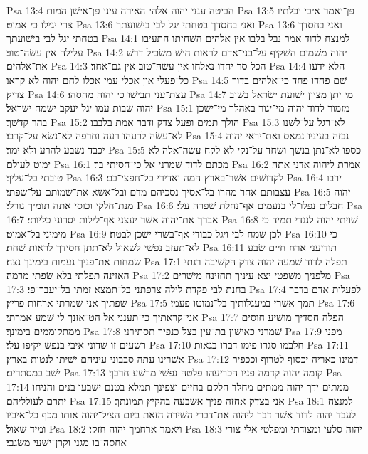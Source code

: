 Psa 13:4  הביטה ענני יהוה אלהי האירה עיני פן־אישׁן המות׃
Psa 13:5  פן־יאמר איבי יכלתיו צרי יגילו כי אמוט׃
Psa 13:6  ואני בחסדך בטחתי יגל לבי בישׁועתך
Psa 13:6  ואני בחסדך בטחתי יגל לבי בישׁועתך
Psa 14:1  למנצח לדוד אמר נבל בלבו אין אלהים השׁחיתו התעיבו עלילה אין עשׂה־טוב׃
Psa 14:2  יהוה משׁמים השׁקיף על־בני־אדם לראות הישׁ משׂכיל דרשׁ את־אלהים׃
Psa 14:3  הכל סר יחדו נאלחו אין עשׂה־טוב אין גם־אחד׃
Psa 14:4  הלא ידעו כל־פעלי און אכלי עמי אכלו לחם יהוה לא קראו׃
Psa 14:5  שׁם פחדו פחד כי־אלהים בדור צדיק׃
Psa 14:6  עצת־עני תבישׁו כי יהוה מחסהו׃
Psa 14:7  מי יתן מציון ישׁועת ישׂראל בשׁוב יהוה שׁבות עמו יגל יעקב ישׂמח ישׂראל׃
Psa 15:1  מזמור לדוד יהוה מי־יגור באהלך מי־ישׁכן בהר קדשׁך׃
Psa 15:2  הולך תמים ופעל צדק ודבר אמת בלבבו׃
Psa 15:3  לא־רגל על־לשׁנו לא־עשׂה לרעהו רעה וחרפה לא־נשׂא על־קרבו׃
Psa 15:4  נבזה בעיניו נמאס ואת־יראי יהוה יכבד נשׁבע להרע ולא ימר׃
Psa 15:5  כספו לא־נתן בנשׁך ושׁחד על־נקי לא לקח עשׂה־אלה לא ימוט לעולם׃
Psa 16:1  מכתם לדוד שׁמרני אל כי־חסיתי בך׃
Psa 16:2  אמרת ליהוה אדני אתה טובתי בל־עליך׃
Psa 16:3  לקדושׁים אשׁר־בארץ המה ואדירי כל־חפצי־בם׃
Psa 16:4  ירבו עצבותם אחר מהרו בל־אסיך נסכיהם מדם ובל־אשׂא את־שׁמותם על־שׂפתי׃
Psa 16:5  יהוה מנת־חלקי וכוסי אתה תומיך גורלי׃
Psa 16:6  חבלים נפלו־לי בנעמים אף־נחלת שׁפרה עלי׃
Psa 16:7  אברך את־יהוה אשׁר יעצני אף־לילות יסרוני כליותי׃
Psa 16:8  שׁויתי יהוה לנגדי תמיד כי מימיני בל־אמוט׃
Psa 16:9  לכן שׂמח לבי ויגל כבודי אף־בשׂרי ישׁכן לבטח׃
Psa 16:10  כי לא־תעזב נפשׁי לשׁאול לא־תתן חסידך לראות שׁחת׃
Psa 16:11  תודיעני ארח חיים שׂבע שׂמחות את־פניך נעמות בימינך נצח׃
Psa 17:1  תפלה לדוד שׁמעה יהוה צדק הקשׁיבה רנתי האזינה תפלתי בלא שׂפתי מרמה׃
Psa 17:2  מלפניך משׁפטי יצא עיניך תחזינה מישׁרים׃
Psa 17:3  בחנת לבי פקדת לילה צרפתני בל־תמצא זמתי בל־יעבר־פי׃
Psa 17:4  לפעלות אדם בדבר שׂפתיך אני שׁמרתי ארחות פריץ׃
Psa 17:5  תמך אשׁרי במעגלותיך בל־נמוטו פעמי׃
Psa 17:6  אני־קראתיך כי־תענני אל הט־אזנך לי שׁמע אמרתי׃
Psa 17:7  הפלה חסדיך מושׁיע חוסים ממתקוממים בימינך׃
Psa 17:8  שׁמרני כאישׁון בת־עין בצל כנפיך תסתירני׃
Psa 17:9  מפני רשׁעים זו שׁדוני איבי בנפשׁ יקיפו עלי׃
Psa 17:10  חלבמו סגרו פימו דברו בגאות׃
Psa 17:11  אשׁרינו עתה סבבוני עיניהם ישׁיתו לנטות בארץ׃
Psa 17:12  דמינו כאריה יכסוף לטרוף וככפיר ישׁב במסתרים׃
Psa 17:13  קומה יהוה קדמה פניו הכריעהו פלטה נפשׁי מרשׁע חרבך׃
Psa 17:14  ממתים ידך יהוה ממתים מחלד חלקם בחיים וצפינך תמלא בטנם ישׂבעו בנים והניחו יתרם לעולליהם׃
Psa 17:15  אני בצדק אחזה פניך אשׂבעה בהקיץ תמונתך׃
Psa 18:1  למנצח לעבד יהוה לדוד אשׁר דבר ליהוה את־דברי השׁירה הזאת ביום הציל־יהוה אותו מכף כל־איביו ומיד שׁאול׃
Psa 18:2  ויאמר ארחמך יהוה חזקי׃
Psa 18:3  יהוה סלעי ומצודתי ומפלטי אלי צורי אחסה־בו מגני וקרן־ישׁעי משׂגבי׃
